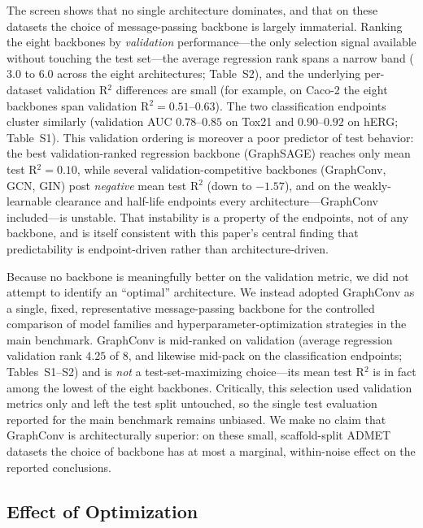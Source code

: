\documentclass[journal]{IEEEtran}
\begin{document}
The screen shows that no single architecture dominates, and that on these datasets the choice of message-passing backbone is largely immaterial. Ranking the eight backbones by \emph{validation} performance---the only selection signal available without touching the test set---the average regression rank spans a narrow band ($3.0$ to $6.0$ across the eight architectures; Table~S2), and the underlying per-dataset validation R$^2$ differences are small (for example, on Caco-2 the eight backbones span validation R$^2 = 0.51$--$0.63$). The two classification endpoints cluster similarly (validation AUC $0.78$--$0.85$ on Tox21 and $0.90$--$0.92$ on hERG; Table~S1). This validation ordering is moreover a poor predictor of test behavior: the best validation-ranked regression backbone (GraphSAGE) reaches only mean test R$^2 = 0.10$, while several validation-competitive backbones (GraphConv, GCN, GIN) post \emph{negative} mean test R$^2$ (down to $-1.57$), and on the weakly-learnable clearance and half-life endpoints every architecture---GraphConv included---is unstable. That instability is a property of the endpoints, not of any backbone, and is itself consistent with this paper's central finding that predictability is endpoint-driven rather than architecture-driven.

Because no backbone is meaningfully better on the validation metric, we did not attempt to identify an ``optimal'' architecture. We instead adopted GraphConv as a single, fixed, representative message-passing backbone for the controlled comparison of model families and hyperparameter-optimization strategies in the main benchmark. GraphConv is mid-ranked on validation (average regression validation rank $4.25$ of $8$, and likewise mid-pack on the classification endpoints; Tables~S1--S2) and is \emph{not} a test-set-maximizing choice---its mean test R$^2$ is in fact among the lowest of the eight backbones. Critically, this selection used validation metrics only and left the test split untouched, so the single test evaluation reported for the main benchmark remains unbiased. We make no claim that GraphConv is architecturally superior: on these small, scaffold-split ADMET datasets the choice of backbone has at most a marginal, within-noise effect on the reported conclusions.


\subsection{Effect of Optimization}
\label{sec:optimization}
\end{document}
